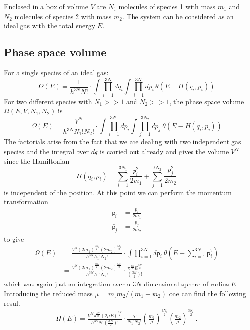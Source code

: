 Enclosed in a box of volume $V$ are $N_1$ molecules of species 1 with mass $m_1$
and $N_2$ molecules of species 2 with mass $m_2$. The system can be 
considered as an ideal gas with the total energy $E$.

\subsection{Phase space volume}
    For a single species of an ideal gas:
    \begin{equation}
        \Omega(E)=\frac{1}{h^{3N}N!}\cdot
        \int \prod_{i=1}^{3N} dq_i \int \prod_{i=1}^{3N} dp_i \ \theta\left(E - H(q_i, p_i)\right)
    \end{equation}
    For two different species with $N_1>>1$ and $N_2>>1$, 
    the phase space volume $\Omega(E,V,N_1,N_2)$ is
    \begin{equation}
        \Omega(E)=\frac{V^N}{h^{3N}N_1!N_2!}\cdot
        \int \prod_{i=1}^{3N_1} dp_i \int \prod_{j=1}^{3N_2} dp_j \ \theta\left(E - H(q_i, p_i)\right)
    \end{equation}
    The factorials arise from the fact that we are dealing with two independent gas species and the integral over $dq$
    is carried out already and gives the volume $V^N$ since the Hamiltonian 
    \begin{equation}
    H(q_i, p_i) = \sum_{i=1}^{3N_1}\frac{p_i^2}{2m_1} + \sum_{j=1}^{3N_2}\frac{p_j^2}{2m_2}
	\end{equation}        
    is independent of the position.
    At this point we can perform the momentum transformation
    \begin{align}
        \bar{\mathsf{p}}_i &= \frac{p_i}{2m_1} \\
        \bar{\mathsf{p}}_j &= \frac{p_j}{2m_2}
    \end{align}
    to give 
    \begin{align}
        \Omega(E)&=\frac{V^N (2m_1)^{\frac{3N_1}{2}} (2m_2)^{\frac{3N_2}{2}}}{h^{3N}N_1!N_2!}\cdot
        \int \prod_{i=1}^{3N} d\bar{\mathsf{p}}_i \ \theta\left(E - \sum_{i=1}^{3N}\bar{\mathsf{p}}_i^2\right) \\
        &=\frac{V^N (2m_1)^{\frac{3N_1}{2}} (2m_2)^{\frac{3N_2}{2}}}{h^{3N}N_1!N_2!}\cdot
        \frac{\pi^{\frac{3N}{2}} E^{\frac{3N}{2}}}{(\frac{3N}{2})!}
    \end{align}
    which was again just an integration over a $3N$-dimensional sphere of radius $E$. \\
    Introducing the reduced mass $\mu = m_1 m_2 / (m_1 + m_2)$ one can find the following result
    \begin{align}
        \Omega(E)=\frac{V^N \pi^{\frac{3N}{2}} (2\mu E)^{\frac{3N}{2}}}{h^{3N}N!\left(\frac{3N}{2}\right)!}\cdot
        \frac{N!}{N_1!N_2!}\left( \frac{m_1}{\mu} \right)^{\frac{3N_1}{2}}\left( \frac{m_2}{\mu} \right)^{\frac{3N_2}{2}} \,.
    \end{align}
    

